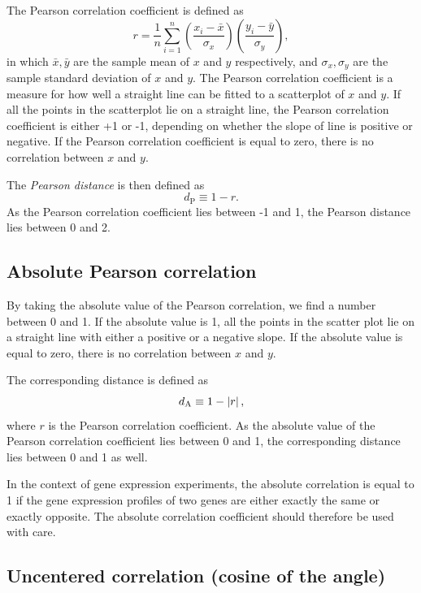 \documentclass{report}
\begin{document}
The Pearson correlation coefficient is defined as
$$r = \frac{1}{n} \sum_{i=1}^n \left( \frac{x_i -\bar{x}}{\sigma_x} \right) \left(\frac{y_i -\bar{y}}{\sigma_y} \right),$$
in which
$\bar{x}, \bar{y}$
are the sample mean of $x$ and $y$ respectively, and
$\sigma_x, \sigma_y$
are the sample standard deviation of $x$ and $y$.
The Pearson correlation coefficient is a measure for how well a straight line can be fitted to a scatterplot of $x$ and $y$.
If all the points in the scatterplot lie on a straight line, the Pearson correlation coefficient is either +1 or -1, depending on whether the slope of line is positive or negative. If the Pearson correlation coefficient is equal to zero, there is no correlation between $x$ and $y$.

The \emph{Pearson distance} is then defined as 
$$d_{\textrm{P}} \equiv 1 - r.$$
As the Pearson correlation coefficient lies between -1 and 1, the Pearson distance lies between 0 and 2.

\subsection*{Absolute Pearson correlation}

By taking the absolute value of the Pearson correlation, we find a number between 0 and 1. If the absolute value is 1, all the points in the scatter plot lie on a straight line with either a positive or a negative slope. If the absolute value is equal to zero, there is no correlation between $x$ and $y$.

The corresponding distance is defined as
$$d_{\textrm A} \equiv 1 - \left|r\right|,$$
where $r$ is the Pearson correlation coefficient. As the absolute value of the Pearson correlation coefficient lies between 0 and 1, the corresponding distance lies between 0 and 1 as well.

In the context of gene expression experiments, the absolute correlation is equal to 1 if the gene expression profiles of two genes are either exactly the same or exactly opposite. The absolute correlation coefficient should therefore be used with care.

\subsection*{Uncentered correlation (cosine of the angle)}
\end{document}
